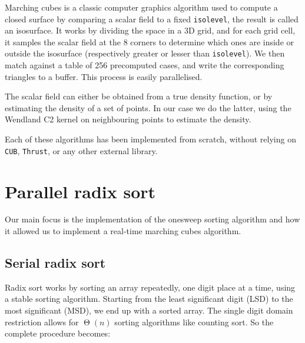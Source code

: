 \documentclass[a4paper]{report}
\newcommand{\ones}{onesweep\xspace}
\DeclareMathOperator{\bigt}{\Theta}
\begin{document}
Marching cubes \cite{bourke1994polygonising} is a classic computer graphics algorithm used to compute a closed surface by comparing a scalar field to a fixed \lstinline{isolevel}, the result is called an isosurface. It works by dividing the space in a 3D grid, and for each grid cell, it samples the scalar field at the 8 corners to determine which ones are inside or outside the isosurface (respectively greater or lesser than \lstinline{isolevel}). We then match against a table of 256 precomputed cases, and write the corresponding triangles to a buffer. This process is easily parallelised.

The scalar field can either be obtained from a true density function, or by estimating the density of a set of points. In our case we do the latter, using the Wendland C2 \cite{wendland1995piecewise} kernel on neighbouring points to estimate the density.

Each of these algorithms has been implemented from scratch, without relying on \lstinline{CUB}, \lstinline{Thrust}, or any other external library.

\chapter{Parallel radix sort}

Our main focus is the implementation of the \ones \cite{adinets2022onesweep} sorting algorithm and how it allowed us to implement a real-time marching cubes algorithm.

\section{Serial radix sort}

Radix sort works by sorting an array repeatedly, one digit place at a time, using a stable sorting algorithm. Starting from the least significant digit (LSD) to the most significant (MSD), we end up with a sorted array. The single digit domain restriction allows for $\bigt(n)$ sorting algorithms like counting sort. So the complete procedure becomes:
\end{document}
